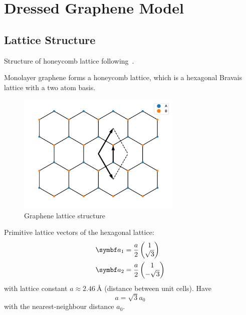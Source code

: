 \documentclass[../notes.tex]{subfiles}
\begin{document}
	
\chapter{Dressed Graphene Model}	

\section{Lattice Structure}\label{sec:lattice-structure-of-graphene}

Structure of honeycomb lattice following~\cite{yangStructureGrapheneIts2018}.

Monolayer graphene forms a honeycomb lattice, which is a hexagonal Bravais lattice with a two atom basis.

\begin{figure}[htb]
	\centering
	\includegraphics[width=0.7\textwidth]{images/graphene lattice}
	\caption{Graphene lattice structure}
	\label{fig:graphene lattice structure}
\end{figure}

Primitive lattice vectors of the hexagonal lattice:
\begin{align}
	\vb{a}_1 &= \frac{a}{2} \begin{pmatrix} 1 \\ \sqrt{3} \end{pmatrix} \\
	\vb{a}_2 &= \frac{a}{2} \begin{pmatrix} 1 \\ -\sqrt{3} \end{pmatrix}
\end{align}
with lattice constant \(a \approx \SI{2.46}{\angstrom}\) (distance between unit cells).
Have
\begin{equation}
	a = \sqrt{3} a_0
\end{equation}
with the nearest-neighbour distance \(a_0\).
\end{document}
